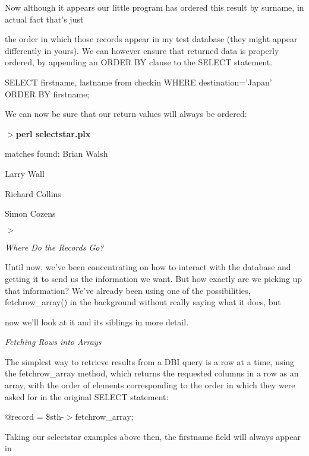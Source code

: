 \documentclass[a4paper,11pt]{book}
\begin{document}
\noindent 

\noindent Now although it appears our little program has ordered this result by surname, in actual fact that's just

\noindent the order in which those records appear in my test database (they might appear differently in yours). We can however ensure that returned data is properly ordered, by appending an ORDER BY clause to the SELECT statement.

\noindent 

\noindent SELECT firstname, lastname from checkin WHERE destination='Japan' ORDER BY firstname;

\noindent 

\noindent We can now be sure that our return values will always be ordered:

\noindent 

\noindent $>$\textbf{perl selectstar.plx}

 matches found: Brian Walsh

\noindent Larry Wall

\noindent Richard Collins

\noindent Simon Cozens

\noindent $>$

\noindent 

\noindent \textit{Where Do the Records Go?}

\noindent Until now, we've been concentrating on how to interact with the database and getting it to send us the information we want. But how exactly are we picking up that information? We've already been using one of the possibilities, fetchrow\_array() in the background without really saying what it does, but

\noindent now we'll look at it and its siblings in more detail.

\noindent 

\noindent \textit{Fetching Rows into Arrays}

\noindent The simplest way to retrieve results from a DBI query is a row at a time, using the fetchrow\_array method, which returns the requested columns in a row as an array, with the order of elements corresponding to the order in which they were asked for in the original SELECT statement:

\noindent 

\noindent @record  = \$sth-$>$fetchrow\_array;

\noindent 

\noindent Taking our selectstar examples  above  then,  the  firstname field  will  always  appear  in
\end{document}
